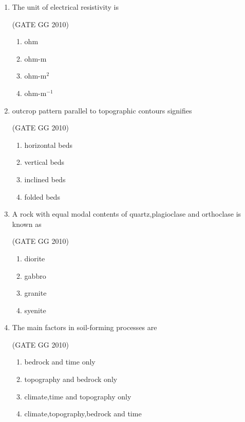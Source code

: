 \documentclass[journal]{IEEEtran}
\begin{document}
\begin{enumerate}
\item  The unit of electrical resistivity is

\hfill (GATE GG 2010) 
\begin{multicols}{4}

\begin{enumerate}
\item ohm
\item ohm-m
\item ohm-m$^2$
\item ohm-m$^{-1}$
\end{enumerate}
\end{multicols}

\item  outcrop pattern parallel to topographic contours signifies

\hfill (GATE GG 2010) 
\begin{multicols}{2}

\begin{enumerate}
    \item horizontal beds
    \item vertical beds
    \item inclined beds
    \item folded beds
\end{enumerate}
\end{multicols}

\item A rock with equal modal contents of quartz,plagioclase and orthoclase is known as

\hfill (GATE GG 2010)
\begin{multicols}{4}

\begin{enumerate}

\item diorite
\item gabbro
\item granite
\item syenite

\end{enumerate}
\end{multicols}


\item   The main factors in soil-forming processes are

\hfill (GATE GG 2010) 

\begin{enumerate}
\item bedrock and time only
\item topography and bedrock only
\item climate,time and topography only
\item climate,topography,bedrock and time
\end{enumerate}



\end{enumerate}
\end{document}
